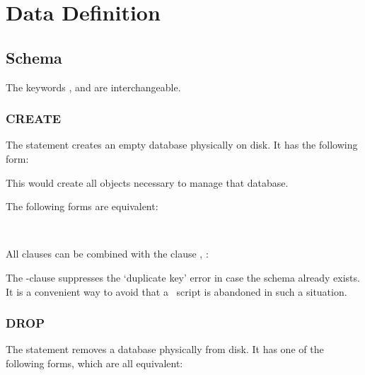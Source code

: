 
\section{Data Definition}
\subsection{Schema}
The keywords
,  and 
are interchangeable.

\subsubsection{CREATE}
The  statement
creates an empty database physically on disk.
It has the following form:

 

This would create all objects necessary
to manage that database.

The following forms are equivalent:

 \\
 

All  clauses can be combined
with the clause , \eg:

  

The -clause
suppresses the `duplicate key' error
in case the schema
already exists.
It is a convenient way to avoid
that a \sql\ script is abandoned
in such a situation.

\subsubsection{DROP}
The  statement
removes a database physically from disk.
It has one of the following forms,
which are all equivalent:

